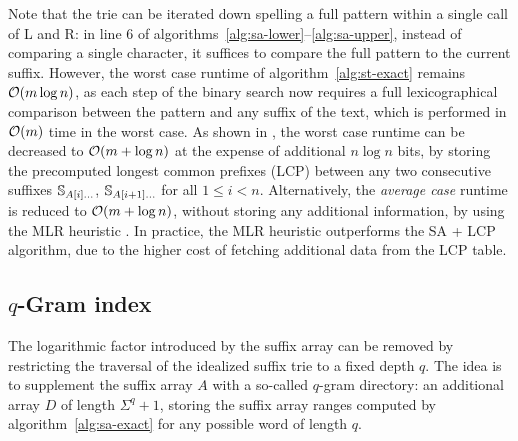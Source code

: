 Note that the trie can be iterated down spelling a full pattern within a single call of \textsc{L} and \textsc{R}: in line 6 of algorithms~\ref{alg:sa-lower}--\ref{alg:sa-upper}, instead of comparing a single character, it suffices to compare the full pattern to the current suffix.
However, the worst case runtime of algorithm~\ref{alg:st-exact} remains $\mathcal{O}(m \log{n})$, as each step of the binary search now requires a full lexicographical comparison between the pattern and any suffix of the text, which is performed in $\mathcal{O}(m)$ time in the worst case.
As shown in \citep{Manber1990}, the worst case runtime can be decreased to $\mathcal{O}(m + \log{n})$ at the expense of additional $n \log{n}$ bits, by storing the precomputed longest common prefixes (LCP) between any two consecutive suffixes $\mathbb {S}_{A[i] \dots}$, $\mathbb {S}_{A[i+1] \dots}$ for all $1 \leq i < n$.
Alternatively, the \emph{average case} runtime is reduced to $\mathcal{O}(m + \log{n})$, without storing any additional information, by using the MLR heuristic \citep{Manber1990}.
In practice, the MLR heuristic outperforms the SA + LCP algorithm, due to the higher cost of fetching additional data from the LCP table.


\subsection{$q$-Gram index}

The logarithmic factor introduced by the suffix array can be removed by restricting the traversal of the idealized suffix trie to a fixed depth $q$.
The idea is to supplement the suffix array $A$ with a so-called $q$-gram directory: an additional array $D$ of length $\Sigma^q + 1$, storing the suffix array ranges computed by algorithm~\ref{alg:sa-exact} for any possible word of length $q$.

